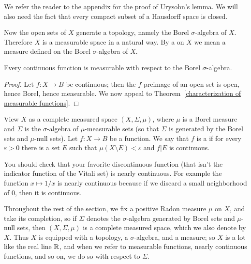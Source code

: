 \begin{subsec}
We refer the reader to the appendix for the proof of Urysohn's lemma.
We will also need the fact that every compact subset of a Hausdorff space is closed.
\end{subsec}

\begin{subsec}
Now the open sets of $X$ generate a topology, namely the Borel $\sigma$-algebra of $X$. Therefore $X$ is a measurable space in a natural way.
By a  on $X$ we mean a measure defined on the Borel $\sigma$-algebra of $X$.
\end{subsec}

\begin{lemma}
Every continuous function is measurable with respect to the Borel $\sigma$-algebra.
\end{lemma}
\begin{proof}
Let $f: X \to B$ be continuous; then the $f$-preimage of an open set is open, hence Borel, hence measurable.
We now appeal to Theorem~\ref{characterization of measurable functions}.
\end{proof}

\begin{definition}
View $X$ as a complete measured space $(X, \Sigma, \mu)$, where $\mu$ is a Borel measure and $\Sigma$ is the $\sigma$-algebra of $\mu$-measurable sets (so that $\Sigma$ is generated by the Borel sets and $\mu$-null sets).
Let $f: X \to B$ be a function.
We say that $f$ is a  if for every $\varepsilon > 0$ there is a set $E$ such that $\mu(X \setminus E) < \varepsilon$ and $f|E$ is continuous.
\end{definition}

\begin{subsec}
You should check that your favorite discontinuous function (that isn't the indicator function of the Vitali set) is nearly continuous.
For example the function $x \mapsto 1/x$ is nearly continuous because if we discard a small neighborhood of $0$, then it is continuous.
\end{subsec}

\begin{subsec}
Throughout the rest of the section, we fix a positive Radon measure $\mu$ on $X$, and take its completion, so if $\Sigma$ denotes the $\sigma$-algebra generated by Borel sets and $\mu$-null sets, then $(X, \Sigma, \mu)$ is a complete measured space, which we also denote by $X$.
Thus $X$ is equipped with a topology, a $\sigma$-algebra, and a measure; so $X$ is a lot like the real line $\mathbb{R}$, and when we refer to measurable functions, nearly continuous functions, and so on, we do so with respect to $\Sigma$.
\end{subsec}

